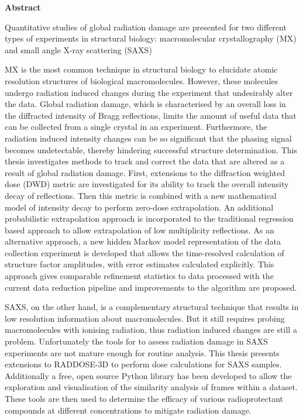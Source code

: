 \newenvironment{abstract}%
{\cleardoublepage\thispagestyle{empty}\null\vfill\begin{center}%
\bfseries Abstract\end{center}}%
{\vfill\null}
\begin{abstract}
\small
\singlespacing
Quantitative studies of global radiation damage are presented for two different types of experiments in structural biology: macromolecular crystallography (MX) and small angle X-ray scattering (SAXS)

MX is the most common technique in structural biology to elucidate atomic resolution structures of biological macromolecules.
However, these molecules undergo radiation induced changes during the experiment that undesirably alter the data.
Global radiation damage, which is characterised by an overall loss in the diffracted intensity of Bragg reflections, limits the amount of useful data that can be collected from a single crystal in an experiment.
Furthermore, the radiation induced intensity changes can be so significant that the phasing signal becomes undetectable, thereby hindering successful structure determination.
This thesis investigates methods to track and correct the data that are altered as a result of global radiation damage.
First, extensions to the diffraction weighted dose (DWD) metric are investigated for its ability to track the overall intensity decay of reflections.
Then this metric is combined with a new mathematical model of intensity decay to perform zero-dose extrapolation.
An additional probabilistic extrapolation approach is incorporated to the traditional regression based approach to allow extrapolation of low multiplicity reflections.
As an alternative approach, a new hidden Markov model representation of the data collection experiment is developed that allows the time-resolved calculation of structure factor amplitudes, with error estimates calculated explicitly.
This approach gives comparable refinement statistics to data processed with the current data reduction pipeline and improvements to the algorithm are proposed.

SAXS, on the other hand, is a complementary structural technique that results in low resolution information about macromolecules.
But it still requires probing macromolecules with ionising radiation, thus radiation induced changes are still a problem.
Unfortunately the tools for to assess radiation damage in SAXS experiments are not mature enough for routine analysis.
This thesis presents extensions to RADDOSE-3D to perform dose calculations for SAXS samples.
Additionally a free, open source Python library has been developed to allow the exploration and visualisation of the similarity analysis of frames within a dataset.
These tools are then used to determine the efficacy of various radioprotectant compounds at different concentrations to mitigate radiation damage.
\end{abstract}
